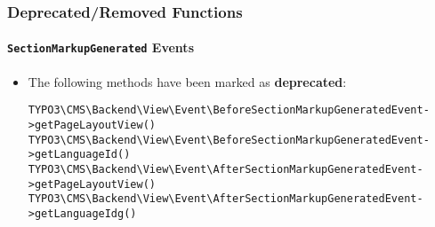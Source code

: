 %

\begin{frame}[fragile]
	\frametitle{Deprecated/Removed Functions}
	\framesubtitle{\texttt{SectionMarkupGenerated} Events}


	\begin{itemize}
		\item The following methods have been marked as \textbf{deprecated}:
\begin{lstlisting}
TYPO3\CMS\Backend\View\Event\BeforeSectionMarkupGeneratedEvent->getPageLayoutView()
TYPO3\CMS\Backend\View\Event\BeforeSectionMarkupGeneratedEvent->getLanguageId()
TYPO3\CMS\Backend\View\Event\AfterSectionMarkupGeneratedEvent->getPageLayoutView()
TYPO3\CMS\Backend\View\Event\AfterSectionMarkupGeneratedEvent->getLanguageIdg()
\end{lstlisting}

	\end{itemize}

\end{frame}


